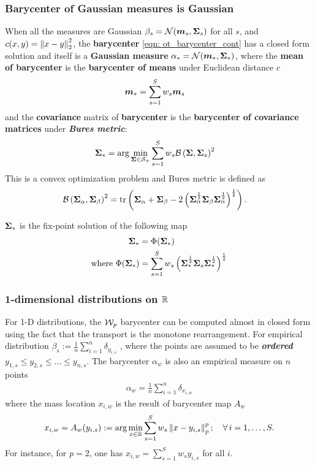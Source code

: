 \documentclass[11pt]{article}
\begin{document}
\subsubsection{Barycenter of  Gaussian measures is Gaussian}
When all the measures are Gaussian $\beta_{s} = {\mathcal N}(\boldsymbol{m}_{s}, \boldsymbol{\Sigma}_{s})$ for all $s$,  and $c(x, y) = \left\|x - y\right\|_{2}^2$,  the \textbf{barycenter} \eqref{eqn: ot_barycenter_cont} has a closed form solution and itself is a \textbf{Gaussian measure} $\alpha_{*} = {\mathcal N}(\boldsymbol{m}_{*}, \boldsymbol{\Sigma}_{*} )$, where the \textbf{mean of barycenter} is the \textbf{barycenter of means} under Euclidean distance $c$
\begin{align}
\boldsymbol{m}_{*}&= \sum_{s=1}^{S}w_{s}\boldsymbol{m}_{s}  \nonumber
\end{align} and the \textbf{covariance} matrix of \textbf{barycenter} is the \textbf{barycenter of covariance matrices} under \textbf{\emph{Bures metric}}:
\begin{align*}
\boldsymbol{\Sigma}_{*}&= \arg\min_{\boldsymbol{\Sigma} \in {\mathcal S}_{+}}\sum_{s=1}^{S}w_{s}{\mathcal B}\left(\boldsymbol{\Sigma}, \boldsymbol{\Sigma}_{s}\right)^2
\end{align*} This is a convex optimization problem and Bures metric is defined as 
\begin{align}
{\mathcal B}\left(\boldsymbol{\Sigma}_{\alpha}, \boldsymbol{\Sigma}_{\beta}\right)^2 &= \mathrm{tr}\left(\boldsymbol{\Sigma}_{\alpha} + \boldsymbol{\Sigma}_{\beta} - 2\left( \boldsymbol{\Sigma}_{\alpha}^{\frac{1}{2}}\boldsymbol{\Sigma}_{\beta}\boldsymbol{\Sigma}_{\alpha}^{\frac{1}{2}}\right)^{\frac{1}{2}} \right).  \nonumber
\end{align}

$\boldsymbol{\Sigma}_{*}$ is the fix-point solution of the following map
\begin{align*}
\boldsymbol{\Sigma}_{*} &= \Phi(\boldsymbol{\Sigma}_{*}) \\
\text{where }\Phi(\boldsymbol{\Sigma}_{*})&=  \sum_{s=1}^{S}w_{s}\left( \boldsymbol{\Sigma}_{*}^{\frac{1}{2}}\boldsymbol{\Sigma}_{s}\boldsymbol{\Sigma}_{*}^{\frac{1}{2}}\right)^{\frac{1}{2}}
\end{align*}


\subsubsection{1-dimensional distributions on ${\mathbb R}$}
For 1-D distributions, the ${\mathcal W}_p$ barycenter can be computed almost in closed form using the fact that the transport is the monotone rearrangement. For empirical distribution $\beta_{s} := \frac{1}{n}\sum_{i=1}^{n}\delta_{y_{i,s}}$ , where the points are assumed to be \emph{\textbf{ordered}} $y_{1,s} \le y_{2,s} \le  \ldots  \le y_{n,s}$. The barycenter $\alpha_{w}$ is also an empirical measure on $n$ points
\begin{align*}
\alpha_{w} = \frac{1}{n}\sum_{i=1}^{n}\delta_{x_{i,w}}
\end{align*} where  the mass location $x_{i,w}$ is the result of barycenter map $ A_{w}$
\begin{align*}
x_{i,w} = A_{w}(y_{i,s}) := \arg\min_{x\in {\mathbb R}}\sum_{s=1}^{S}w_{s}\left\|x - y_{i,s}\right\|_{p}^{p}; \quad \forall\, i=1,\ldots, S.
\end{align*} For instance, for $p = 2$, one has $x_{i,w} = \sum_{s=1}^{S}w_{s} y_{i,s}$ for all $i$. 
\end{document}
